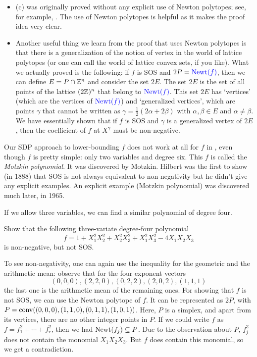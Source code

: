 \begin{itemize}
	\item {}(c) was originally proved without any explicit use of Newton polytopes; see, for example, \cite{Marshall:2008}. The use of Newton polytopes is helpful as it makes the proof idea very clear.
	\item Another useful thing we learn from the proof that uses Newton polytopes is that there is a generalization of the notion of vertex in the world of lattice polytopes (or one can call the world of lattice convex sets, if you like). What we actually proved is the following: if $f$ is SOS and $2P = \textcolor{blue}{\operatorname{Newt}(f)}$, then we can define $E = P \cap \mathbb{Z}^n$ and consider the set $2 E$. The set $2E$ is the set of all points of the lattice $(2\mathbb{Z})^n$ that belong to $\textcolor{blue}{\operatorname{Newt}(f)}$. This set $2 E$ has `vertices' (which are the vertices of $\textcolor{blue}{\operatorname{Newt}(f)}$) and `generalized vertices', which are points $\gamma$ that cannot be written as $\gamma = \frac{1}{2} (2 \alpha + 2 \beta)$ with $\alpha, \beta \in E$ and $\alpha \ne \beta$. We have essentially shown that if $f$ is SOS and $\gamma$ is a generalized vertex of $2 E$, then the coefficient of $f$ at $X^\gamma$ must be non-negative.
\end{itemize}


Our SDP approach to lower-bounding $f$ does not work at all for $f$ in , even though $f$ is pretty simple: only two variables and degree six. This $f$ is called the \emph{Motzkin polynomial}. It was discovered by Motzkin. Hilbert was the first to show (in 1888) that SOS is not always equivalent to non-negativity but he didn't give any explicit examples. An explicit example (Motzkin polynomial) was discovered much later, in 1965.

If we allow three variables, we can find a similar polynomial of degree four.

\begin{exercise}
	\label{choi:lam:exer}	
	Show that the following three-variate degree-four polynomial 
	\[
		f = 1 + X_1^2 X_2^2 + X_2^2 X_3^2 + X_1^2 X_3^2 - 4 X_1 X_2 X_3
	\]
	is non-negative, but not SOS. 
\end{exercise} 
\begin{solution}
	To see non-negativity, one can again use the inequality for the geometric and the arithmetic mean: observe that for the four exponent vectors 
	\[
		(0,0,0), (2,2,0),(0,2,2), (2,0,2), (1,1,1)
	\]
	the last one is the arithmetic mean of the remaining ones. 
	For showing that $f$ is not SOS, we can use the Newton polytope of $f$. It can be represented as $2 P$, with $P = \operatorname{conv}( (0,0,0), (1,1,0), (0,1,1), (1,0,1) )$. Here, $P$ is a simplex, and apart from its vertices, there are no other integer points in $P$. If we could write $f$ as $f= f_1^2 + \cdots + f_r^2$, then we had $\operatorname{Newt}(f_j) \subseteq P$. Due to the observation about $P$,  $f_j^2$ does not contain the monomial  $X_1 X_2 X_3$. But $f$ does contain this monomial, so we get a contradiction. 
\end{solution}

